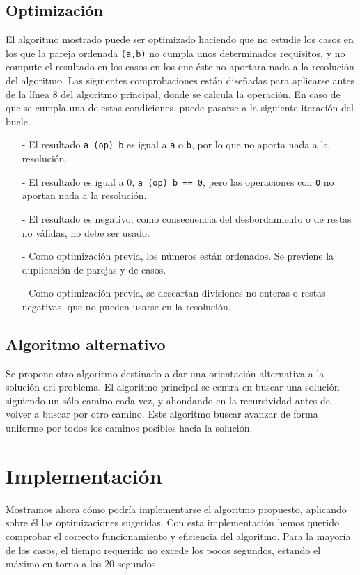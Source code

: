 \documentclass[a4paper,10pt]{scrartcl}
\def\C++#1{\texttt{#1}}
\begin{document}
   \subsection{Optimización}
   El algoritmo mostrado puede ser optimizado haciendo que no estudie los casos en los que la pareja ordenada \C++{(a,b)} no cumpla unos
   determinados requisitos, y no compute el resultado en los casos en los que éste no aportara nada a la resolución del algoritmo. Las
   siguientes comprobaciones están diseñadas para aplicarse antes de la línea 8 del algoritmo principal, donde se calcula la operación. 
   En caso de que se cumpla una de estas condiciones, puede pasarse a la siguiente iteración del bucle.\\
   \begin{itemize}
    \item [-] El resultado \C++{a (op) b} es igual a \C++{a} o \C++{b}, por lo que no aporta nada a la resolución.
    \item [-] El resultado es igual a 0, \C++{a (op) b == 0}, pero las operaciones con \C++{0} no aportan nada a la resolución.
    \item [-] El resultado es negativo, como consecuencia del desbordamiento o de restas no válidas, no debe ser usado.
    \item [-] Como optimización previa, los números están ordenados. Se previene la duplicación de parejas y de casos.
    \item [-] Como optimización previa, se descartan divisiones no enteras o restas negativas, que no pueden usarse en la resolución.
   \end{itemize}

   
   \newpage
   \subsection{Algoritmo alternativo}
   Se propone otro algoritmo destinado a dar una orientación alternativa a la solución del problema. El algoritmo principal se centra
   en buscar una solución siguiendo un sólo camino cada vez, y ahondando en la recursividad antes de volver a buscar por otro camino.
   Este algoritmo buscar avanzar de forma uniforme por todos los caminos posibles hacia la solución.
   
   
   \newpage
   \section{Implementación}
   Mostramos ahora cómo podría implementarse el algoritmo propuesto, aplicando sobre él las optimizaciones sugeridas.
   Con esta implementación hemos querido comprobar el correcto funcionamiento y eficiencia del algoritmo. Para la mayoría
   de los casos, el tiempo requerido no excede los pocos segundos, estando el máximo en torno a los 20 segundos. \\
   
\end{document}
